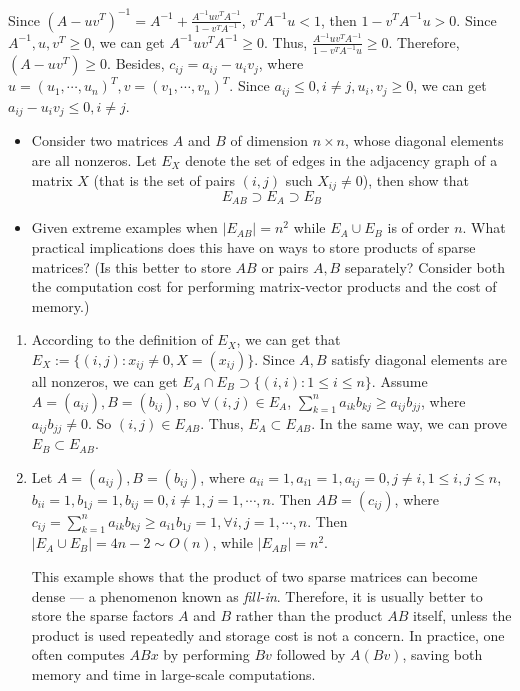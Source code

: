 \documentclass{ctexart}
\begin{document}
\begin{solution}
  Since \((A-uv^T)^{-1}=A^{-1}  + \frac{A^{-1}uv^TA^{-1}}{1-v^TA^{-1}} \), \( v^TA^{-1}u <1 \), then \(1-v^TA^{-1}u >0 \). 
  Since \(A^{-1},u, v^T \geq 0 \), we can get \(A^{-1}uv^TA^{-1} \geq 0 \). Thus, \(\frac{A^{-1}uv^TA^{-1}}{1-v^TA^{-1}u} \geq0 \). 
  Therefore, \((A-uv^T)\geq0 \). Besides, \(c_{ij}=a_{ij}-u_iv_j \), where \(u=(u_1,\cdots,u_n)^T,v=(v_1,\cdots,v_n)^T \). 
  Since \(a_{ij}\leq 0, i \neq j, u_i,v_j \geq 0 \), we can get \(  a_{ij} - u_iv_j \leq 0, i \neq j\).
\end{solution}

 \begin{problem} 
   \begin{itemize}
     \item   Consider two matrices \(A \) and \(B \) of dimension \(n \times n \), whose diagonal 
       elements are all nonzeros. Let \(E_X \) denote the set of edges in the 
       adjacency graph of a matrix \(X \) (that is the set of pairs \((i,j) \) 
       such \(  X_{ij} \neq 0\)), then show that \[
         E_{AB} \supset E_A \supset E_B
       \]
     \item Given extreme examples when \(|E_{AB}| =n^2 \) while \(E_A \cup E_B \) is of 
       order \(n \). What practical implications does this have on ways to store 
       products of sparse matrices? (Is this better to store \(AB \) or pairs \(A,B \) 
       separately? Consider both the computation cost for performing matrix-vector 
       products and the cost of memory.)
   \end{itemize}
 \end{problem}
 \begin{solution}
  \begin{enumerate}
    \item According to the definition of \(E_X \), we can get that \( E_X :=\{(i,j):x_{ij} \neq 0, X=(x_{ij})\} \). 
      Since \(A,B \) satisfy diagonal elements are all nonzeros, we can get \(E_A \cap E_B \supset \{(i,i):1 \leq i \leq n\} \).
      Assume \(A =(a_{ij}),B=(b_{ij}) \), so \(\forall (i,j) \in E_{A} \), \(\sum_{k=1}^{n}a_{ik}b_{kj} \geq a_{ij}b_{jj}  \), where \(a_{ij}b_{jj} \neq 0 \).
      So \((i,j) \in E_{AB} \). Thus, \(E_{A} \subset E_{AB} \). In the same way, we can prove \(E_{B} \subset E_{AB} \).
    \item Let \(A=(a_{ij}), B=(b_{ij}) \), where \(a_{ii}=1,a_{i 1}=1,a_{ij}=0, j \neq i, 1 \leq i,j \leq n \), 
      \(b_{ii}=1,  b_{1j}=1, b_{ij}=0, i \neq 1, j=1,\cdots,n \).  Then \(AB=(c_{ij}) \), where \(c_{ij}=\sum_{k=1}^{n}a_{ik}b_{kj} \geq a_{i 1}b_{1j}=1, \forall i,j=1,\cdots,n   \).
      Then \(|E_{A} \cup E_{B}| =4n-2 \sim O(n) \), while \(|E_{AB}|= n^2\). 

      This example shows that the product of two sparse matrices can become dense — a phenomenon known as \emph{fill-in}.  
Therefore, it is usually better to store the sparse factors \(A\) and \(B\) rather than the product \(AB\) itself, unless the product is used repeatedly and storage cost is not a concern.  
In practice, one often computes \(ABx\) by performing \(Bv\) followed by \(A(Bv)\), saving both memory and time in large-scale computations.
  \end{enumerate}
 \end{solution}
\end{document}
